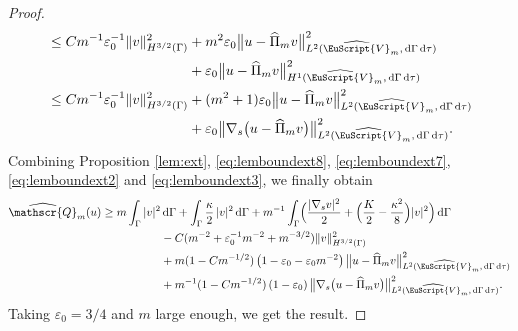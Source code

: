 \documentclass[10pt]{amsart}
\let\mathcal \EuScript
\newcommand{\scrQ}{\mathscr{Q}}
\newcommand{\cV}{\mathcal{V}}
\theoremstyle{plain}
\theoremstyle{definition}
\newcommand{\dx}{\mathrm{\,d}}
\begin{document}
\begin{proof}
\begin{equation}
\begin{split}
&\leq Cm^{-1}\varepsilon_0^{-1}\|v\|_{H^{3/2}(\Gamma)} ^2
+ m^{2}\varepsilon_0\bigl\|u - \widehat{\Pi}_mv\bigr\|^2_{L^2(\widehat{\cV}_m, \dx\Gamma\dx\tau)}\\
&\hspace*{3.55cm}+\varepsilon_0\bigl\|u - \widehat{\Pi}_mv\bigr\|^2_{H^1(\widehat{\cV}_m, \dx\Gamma\dx\tau)}
\\
&\leq Cm^{-1}\varepsilon_0^{-1}\|v\|_{H^{3/2}(\Gamma)} ^2
+ (m^{2}+1)\varepsilon_0\bigl\|u - \widehat{\Pi}_mv\bigr\|^2_{L^2(\widehat{\cV}_m, \dx\Gamma\dx\tau)}\\
&\hspace*{3.55cm}+\varepsilon_0\bigl\|\nabla_s\bigl(u - \widehat{\Pi}_mv\bigr)\bigr\|^2_{L^2(\widehat{\cV}_m, \dx\Gamma\dx\tau)}.
\end{split}\end{equation}
Combining Proposition \ref{lem:ext}, \eqref{eq:lemboundext8}, \eqref{eq:lemboundext7}, \eqref{eq:lemboundext2} and \eqref{eq:lemboundext3}, we finally obtain
\[\begin{split}
\widehat{\scrQ}_m(u)\geq
m\int_\Gamma
|v|^2
&\dx\Gamma
+
\int_\Gamma
\frac{\kappa}{2}\,|v|^2
\dx\Gamma
+
m^{-1}\int_\Gamma \Bigl(
\frac{|\nabla_s v|^2}{2}
+
\Bigl(\frac{K}{2}-\frac{\kappa^2}{8}\Bigr)|v|^2
\Bigr)\dx\Gamma
\\&
-C(m^{-2}+\varepsilon_0^{-1}m^{-2}+m^{-3/2}) \|v\|_{H^{3/2}(\Gamma)} ^2
\\&
+m(1-Cm^{-1/2})\left(1-\varepsilon_0-\varepsilon_0 m^{-2}\right)
\bigl\|u-\widehat{\Pi}_mv\bigr\|^2_{L^2(\widehat{\cV}_m, \dx\Gamma\dx\tau)}
\\
&
+m^{-1}(1-Cm^{-1/2})\left(1-\varepsilon_0\right)
\bigl\|\nabla_s \bigl(u - \widehat{\Pi}_mv\bigr)\bigr\|^2_{L^2(\widehat{\cV}_m, \dx\Gamma\dx\tau)}.
\end{split}\]
Taking $\varepsilon_0 = 3/4$ and $m$ large enough, we get the result.
\end{proof}
\end{document}
